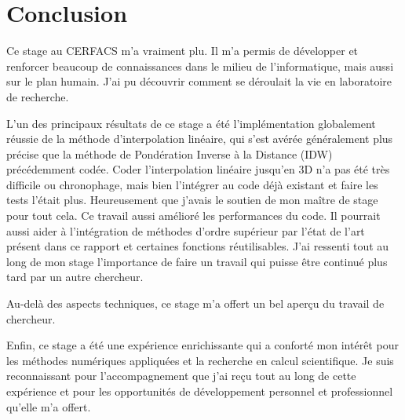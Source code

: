\chapter*{Conclusion}


Ce stage au CERFACS m'a vraiment plu. Il m'a permis de développer et renforcer beaucoup de connaissances dans le milieu de l'informatique, mais aussi sur le plan humain. J'ai pu découvrir comment se déroulait la vie en laboratoire de recherche.

L'un des principaux résultats de ce stage a été l'implémentation globalement réussie de la méthode d'interpolation linéaire, qui s'est avérée généralement plus précise que la méthode de Pondération Inverse à la Distance (IDW) précédemment codée.
Coder l'interpolation linéaire jusqu'en 3D n'a pas été très difficile ou chronophage, mais bien l'intégrer au code déjà existant et faire les tests l'était plus. Heureusement que j'avais le soutien de mon maître de stage pour tout cela.
Ce travail aussi amélioré les performances du code.
Il pourrait aussi aider à l'intégration de méthodes d'ordre supérieur par l'état de l'art présent dans ce rapport et certaines fonctions réutilisables.
J'ai ressenti tout au long de mon stage l'importance de faire un travail qui puisse être continué plus tard par un autre chercheur.

Au-delà des aspects techniques, ce stage m'a offert un bel aperçu du travail de chercheur.

Enfin, ce stage a été une expérience enrichissante qui a conforté mon intérêt pour les méthodes numériques appliquées et la recherche en calcul scientifique. Je suis reconnaissant pour l'accompagnement que j'ai reçu tout au long de cette expérience et pour les opportunités de développement personnel et professionnel qu'elle m'a offert.